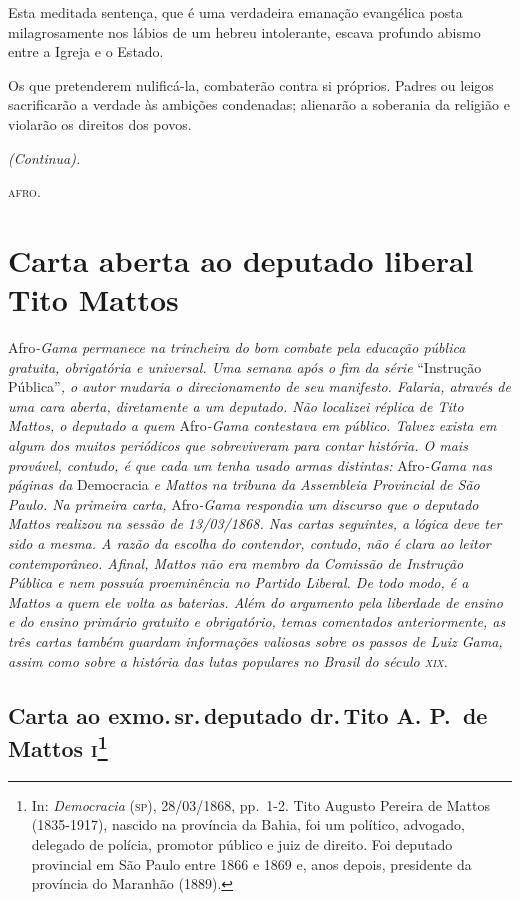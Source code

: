 Esta meditada sentença, que é uma verdadeira emanação evangélica posta
milagrosamente nos lábios de um hebreu intolerante, escava profundo
abismo entre a Igreja e o Estado.

Os que pretenderem nulificá-la, combaterão contra si próprios. Padres ou
leigos sacrificarão a verdade às ambições condenadas; alienarão a
soberania da religião e violarão os direitos dos povos.

\emph{(Continua).}
\begin{flushright}
\textsc{afro}.
\end{flushright}

\part{Carta aberta ao deputado liberal Tito Mattos}

\begin{argumento}
Afro\emph{-Gama permanece na trincheira do bom combate pela educação
pública gratuita, obrigatória e universal. Uma semana após o fim da
série} ``Instrução Pública''\emph{, o autor mudaria o direcionamento de
seu manifesto. Falaria, através de uma cara aberta, diretamente a um
deputado. Não localizei réplica de Tito Mattos, o deputado a quem}
Afro\emph{-Gama contestava em público. Talvez exista em algum dos muitos
periódicos que sobreviveram para contar história. O mais provável,
contudo, é que cada um tenha usado armas distintas:} Afro\emph{-Gama nas
páginas da} Democracia \emph{e Mattos na tribuna da Assembleia
Provincial de São Paulo. Na primeira carta,} Afro\emph{-Gama respondia
um discurso que o deputado Mattos realizou na sessão de 13/03/1868. Nas
cartas seguintes, a lógica deve ter sido a mesma. A razão da escolha do
contendor, contudo, não é clara ao leitor contemporâneo. Afinal, Mattos
não era membro da Comissão de Instrução Pública e nem possuía
proeminência no Partido Liberal. De todo modo, é a Mattos a quem ele
volta as baterias. Além do argumento pela liberdade de ensino e do
ensino primário gratuito e obrigatório, temas comentados anteriormente,
as três cartas também guardam informações valiosas sobre os passos de
Luiz Gama, assim como sobre a história das lutas populares no Brasil do
século \textsc{xix}.}
\end{argumento}

\chapter{Carta ao exmo.\,sr.\,deputado dr.\,Tito A. P.~de Mattos
\textsc{i}\footnote{In: \emph{Democracia} (\textsc{sp}), 28/03/1868, pp.~1-2. Tito
  Augusto Pereira de Mattos (1835-1917), nascido na província da Bahia,
  foi um político, advogado, delegado de polícia, promotor público e
  juiz de direito. Foi deputado provincial em São Paulo entre 1866 e
  1869 e, anos depois, presidente da província do Maranhão (1889).}}

